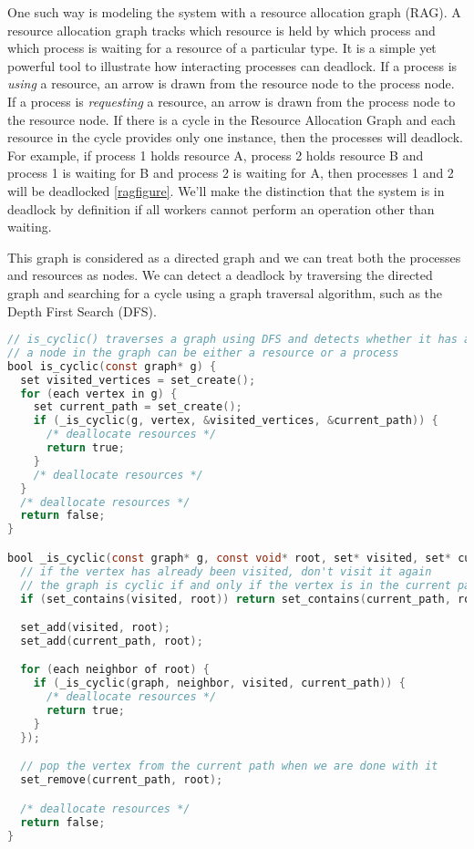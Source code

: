 One such way is modeling the system with a resource allocation graph (RAG).
A resource allocation graph tracks which resource is held by which process and which process is waiting for a resource of a particular type.
It is a simple yet powerful tool to illustrate how interacting processes can deadlock.
If a process is \emph{using} a resource, an arrow is drawn from the resource node to the process node.
If a process is \emph{requesting} a resource, an arrow is drawn from the process node to the resource node.
If there is a cycle in the Resource Allocation Graph and each resource in the cycle provides only one instance, then the processes will deadlock.
For example, if process 1 holds resource A, process 2 holds resource B and process 1 is waiting for B and process 2 is waiting for A, then processes 1 and 2 will be deadlocked \ref{ragfigure}.
We'll make the distinction that the system is in deadlock by definition if all workers cannot perform an operation other than waiting.

This graph is considered as a directed graph and we can treat both the processes and resources as nodes.
We can detect a deadlock by traversing the directed graph and searching for a cycle using a graph traversal algorithm, such as the Depth First Search (DFS).

\begin{lstlisting}[language=C]
// is_cyclic() traverses a graph using DFS and detects whether it has a cycle
// a node in the graph can be either a resource or a process
bool is_cyclic(const graph* g) {
  set visited_vertices = set_create();
  for (each vertex in g) {
    set current_path = set_create();
    if (_is_cyclic(g, vertex, &visited_vertices, &current_path)) {
      /* deallocate resources */
      return true;
    }
    /* deallocate resources */
  }
  /* deallocate resources */
  return false;
}

bool _is_cyclic(const graph* g, const void* root, set* visited, set* current_path) {
  // if the vertex has already been visited, don't visit it again
  // the graph is cyclic if and only if the vertex is in the current path, i.e. a back edge exists
  if (set_contains(visited, root)) return set_contains(current_path, root);

  set_add(visited, root);
  set_add(current_path, root);

  for (each neighbor of root) {
    if (_is_cyclic(graph, neighbor, visited, current_path)) {
      /* deallocate resources */
      return true;
    }
  });

  // pop the vertex from the current path when we are done with it
  set_remove(current_path, root);

  /* deallocate resources */
  return false;
}
\end{lstlisting}

